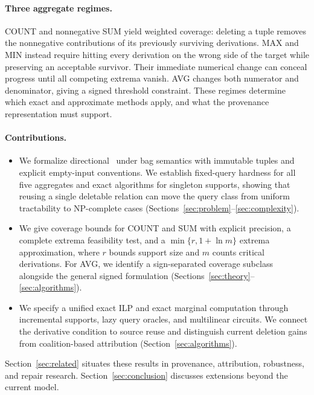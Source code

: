 \paragraph{Three aggregate regimes.}
COUNT and nonnegative SUM yield weighted coverage: deleting a tuple removes
the nonnegative contributions of its previously surviving derivations.
MAX and MIN instead require hitting every derivation on the wrong side of
the target while preserving an acceptable survivor. Their immediate
numerical change can conceal progress until all competing extrema vanish.
AVG changes both numerator and denominator, giving a signed threshold
constraint. These regimes determine which exact and approximate methods
apply, and what the provenance representation must support.

\paragraph{Contributions.}
\begin{itemize}
\item We formalize directional \MIW\ under bag semantics with immutable
tuples and explicit empty-input conventions. We establish fixed-query
hardness for all five aggregates and exact algorithms for singleton
supports, showing that reusing a single deletable relation can move the
query class from uniform tractability to NP-complete cases
(Sections~\ref{sec:problem}--\ref{sec:complexity}).
\item We give coverage bounds for COUNT and SUM with explicit precision,
a complete extrema feasibility test, and a $\min\{r,1+\ln m\}$ extrema approximation,
where $r$ bounds support size and $m$ counts critical derivations. For AVG,
we identify a sign-separated coverage subclass alongside the general
signed formulation (Sections~\ref{sec:theory}--\ref{sec:algorithms}).
\item We specify a unified exact ILP and exact marginal computation through
incremental supports, lazy query oracles, and multilinear circuits. We
connect the derivative condition to source reuse and distinguish current
deletion gains from coalition-based attribution
(Section~\ref{sec:algorithms}).
\end{itemize}
Section~\ref{sec:related} situates these results in provenance, attribution,
robustness, and repair research. Section~\ref{sec:conclusion} discusses
extensions beyond the current model.
